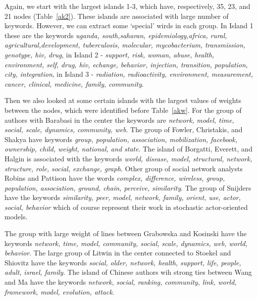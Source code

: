 \documentclass[11pt]{article} %
\begin{document}
Again, we start with the largest islands 1-3, which have, respectively, 35, 23, and 21 nodes (Table~\ref{ak2}). These islands are associated with large number of keywords. However, we can extract some `special' wirds in each group. In Island 1 these are the keywords \textit{uganda, south,saharan, epidemiology,africa,  rural, agricultural,development, tuberculosis, molecular, mycobacterium, transmission, genotype, hiv, drug}, in Island 2 - \textit{support, risk, woman, abuse, health, environment, self, drug, hiv, echange, behavior, injection, transition, population, city, integration}, in Island 3 - \textit{radiation, radioactivity, environment, measurement, cancer, clinical, medicine, family, community}.  \medskip

Then we also looked at some certain islands with the largest values of weights between the nodes, which were identified before Table~\ref{akw}. For the group of authors with Barabasi in the center the keywords are \textit{network, model, time, social, scale, dynamics, community, web}. The group of Fowler, Christakis, and Shakya have keywords \textit{group, population, association, mobilization, facebook,  ownership, child, weight, national, and state}. The island of Borgatti,  Everett, and Halgin is associated with the keywords \textit{world, disease, model, structural, network, structure, role, social, exchange, graph}.  Other group of social network analysts Robins and Pattison have the words \textit{complex, difference, wireless, group, population, association, ground, chain, perceive, similarity}. The group of Snijders have the keywords \textit{similarity, peer, model, network, family, orient, use, actor, social, behavior} which of course represent their work in stochastic actor-oriented models. \medskip

The group with large weight of lines between Grabowska and Kosinski have the keywords \textit{network, time, model, community, social, scale, dynamics, web, world, behavior}. The large group of Litwin in the center connected to Stoekel and Shiovitz have the keywords \textit{social, older,  network, health, support, life, people, adult, israel, family}. The island of  Chinese authors wih strong ties between Wang and Ma have the keywords \textit{network, social, ranking, community, link, world, framework, model, evolution, attack}. \medskip
\end{document}
